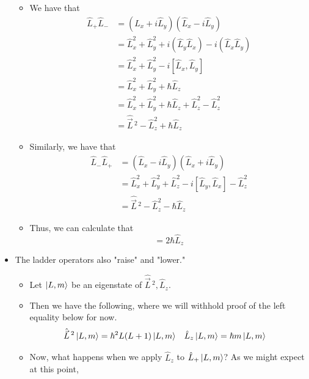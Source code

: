 \documentclass[../notes.tex]{subfiles}
\begin{document}
\begin{itemize}
    \begin{itemize}
        \item We have that
        \begin{align*}
            \hat{L}_+\hat{L}_- &= (\hat{L}_x+i\hat{L}_y)(\hat{L}_x-i\hat{L}_y)\\
            &= \hat{L}_x^2+\hat{L}_y^2+i(\hat{L}_y\hat{L}_x)-i(\hat{L}_x\hat{L}_y)\\
            &= \hat{L}_x^2+\hat{L}_y^2-i[\hat{L}_x,\hat{L}_y]\\
            &= \hat{L}_x^2+\hat{L}_y^2+\hbar\hat{L}_z\\
            &= \hat{L}_x^2+\hat{L}_y^2+\hbar\hat{L}_z+\hat{L}_z^2-\hat{L}_z^2\\
            &= \hat{\vec{L}}{\,}^2-\hat{L}_z^2+\hbar\hat{L}_z
        \end{align*}
        \item Similarly, we have that
        \begin{align*}
            \hat{L}_-\hat{L}_+ &= (\hat{L}_x-i\hat{L}_y)(\hat{L}_x+i\hat{L}_y)\\
            &= \hat{L}_x^2+\hat{L}_y^2+\hat{L}_z^2-i[\hat{L}_y,\hat{L}_x]-\hat{L}_z^2\\
            &= \hat{\vec{L}}{\,}^2-\hat{L}_z^2-\hbar\hat{L}_z
        \end{align*}
        \item Thus, we can calculate that
        \begin{equation*}
            [\hat{L}_+,\hat{L}_-] = 2\hbar\hat{L}_z
        \end{equation*}
    \end{itemize}
    \item The ladder operators also "raise" and "lower."
    \begin{itemize}
        \item Let $\ket{L,m}$ be an eigenstate of $\hat{\vec{L}}{\,}^2,\hat{L}_z$.
        \item Then we have the following, where we will withhold proof of the left equality below for now.
        \begin{align*}
            \hat{\vec{L}}{\,}^2\ket{L,m} &= \hbar^2L(L+1)\ket{L,m}&
            \hat{L}_z\ket{L,m} &= \hbar m\ket{L,m}
        \end{align*}
        \item Now, what happens when we apply $\hat{L}_z$ to $\hat{L}_+\ket{L,m}$? As we might expect at this point,
        \begin{align*}

\end{align*}
\end{itemize}
\end{itemize}
\end{document}
